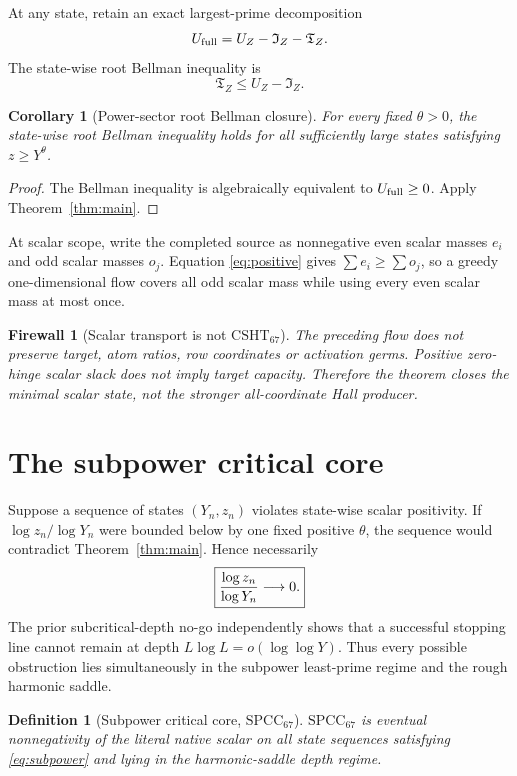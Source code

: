 \documentclass[11pt]{article}
\newtheorem{corollary}[theorem]{Corollary}
\newtheorem{definition}[theorem]{Definition}
\newtheorem{firewall}[theorem]{Firewall}
\newcommand{\CSHT}{\mathrm{CSHT}_{67}}
\newcommand{\SPCC}{\mathrm{SPCC}_{67}}
\begin{document}
At any state, retain an exact largest-prime decomposition
\[
 U_{\rm full}=U_Z-\mathfrak I_Z-\mathfrak T_Z.
\]
The state-wise root Bellman inequality is
\[
 \mathfrak T_Z\le U_Z-\mathfrak I_Z.
\]

\begin{corollary}[Power-sector root Bellman closure]\label{cor:rblpte}
For every fixed $\theta>0$, the state-wise root Bellman inequality holds for
all sufficiently large states satisfying $z\ge Y^\theta$.
\end{corollary}

\begin{proof}
The Bellman inequality is algebraically equivalent to $U_{\rm full}\ge0$.
Apply Theorem~\ref{thm:main}.
\end{proof}

At scalar scope, write the completed source as nonnegative even scalar masses
$e_i$ and odd scalar masses $o_j$.  Equation \eqref{eq:positive} gives
$\sum e_i\ge\sum o_j$, so a greedy one-dimensional flow covers all odd scalar
mass while using every even scalar mass at most once.

\begin{firewall}[Scalar transport is not $\CSHT$]
The preceding flow does not preserve target, atom ratios, row coordinates or
activation germs.  Positive zero-hinge scalar slack does not imply target
capacity.  Therefore the theorem closes the minimal scalar state, not the
stronger all-coordinate Hall producer.
\end{firewall}

\section{The subpower critical core}

Suppose a sequence of states $(Y_n,z_n)$ violates state-wise scalar positivity.
If $\log z_n/\log Y_n$ were bounded below by one fixed positive $\theta$, the
sequence would contradict Theorem~\ref{thm:main}.  Hence necessarily
\begin{equation}\label{eq:subpower}
 \boxed{{\log z_n\over\log Y_n}\longrightarrow0.}
\end{equation}
The prior subcritical-depth no-go independently shows that a successful
stopping line cannot remain at depth
$L\log L=o(\log\log Y)$.  Thus every possible obstruction lies simultaneously
in the subpower least-prime regime and the rough harmonic saddle.

\begin{definition}[Subpower critical core, $\SPCC$]
$\SPCC$ is eventual nonnegativity of the literal native scalar on all state
sequences satisfying \eqref{eq:subpower} and lying in the harmonic-saddle depth
regime.
\end{definition}
\end{document}
